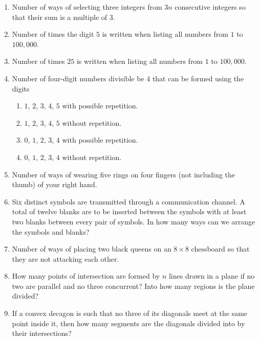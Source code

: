 \documentclass[svgnames]{amsart}
\begin{document}
\begin{enumerate}[leftmargin=*]
\item Number of ways of selecting three integers from $3n$ consecutive integers so that their sum is a multiple of $3$.

\item Number of times the digit $5$ is written when listing all numbers from $1$ to $100,000$.

\item Number of times $25$ is written when listing all numbers from $1$ to $100,000$.

\item Number of four-digit numbers divisible be $4$ that can be formed using the digits
\begin{enumerate}[label=(\roman*)]
	\item $1$, $2$, $3$, $4$, $5$ with possible repetition.
	\item $1$, $2$, $3$, $4$, $5$ without repetition.
	\item $0$, $1$, $2$, $3$, $4$ with possible repetition.
	\item $0$, $1$, $2$, $3$, $4$ without repetition.	
\end{enumerate}

\item Number of ways of wearing five rings on four fingers (not including the thumb) of your right hand.

\item Six distinct symbols are transmitted through a communication channel. A total of twelve blanks are to be inserted between the symbols with at least two blanks between every pair of symbols. In how many ways can we arrange the symbols and blanks?

\item Number of ways of placing two black queens on an $8 \times 8$ chessboard so that they are not attacking each other.

\item How many points of intersection are formed by $n$ lines drawn in a plane if no two are parallel and no three concurrent? Into how many regions is the plane divided?

\item If a convex decagon is such that no three of its diagonals meet at the same point inside it, then how many segments are the diagonals divided into by their intersections?
\end{enumerate}
\end{document}
